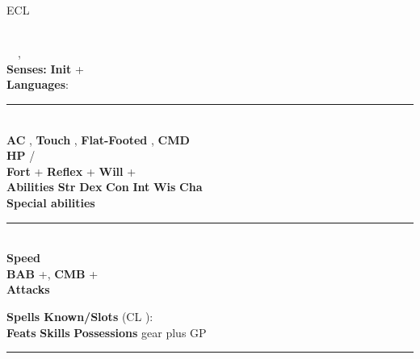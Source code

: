 \documentclass[article,10pt]{memoir}
\newcommand{\hr}{\vspace{-1.5ex}\rule{\linewidth}{0.4pt}}
\newcommand{\afterenum}{\everypar{\parindent=0pt\hangindent=1em}}
\newcounter{skillmod}
\newcounter{abilitymod}
\newcounter{classmod}
\newcommand{\skill}[6]{
 \ifthenelse{\equal{#2}{Str}}{
 \setcounter{abilitymod}{\value{strmod}}
}{\ifthenelse{\equal{#2}{Dex}}{
 \setcounter{abilitymod}{\value{dexmod}}
}{\ifthenelse{\equal{#2}{Con}}{
 \setcounter{abilitymod}{\value{conmod}}
}{\ifthenelse{\equal{#2}{Int}}{
 \setcounter{abilitymod}{\value{intmod}}
}{\ifthenelse{\equal{#2}{Wis}}{
 \setcounter{abilitymod}{\value{wismod}}
}{\ifthenelse{\equal{#2}{Cha}}{
 \setcounter{abilitymod}{\value{chamod}}
}{
}}}}}}
\ifthenelse{\equal{#1}{Perception}}{
\setcounter{classmod}{\minof{#3}{#5}*3}
\setcounter{skillmod}{#3+\value{abilitymod}+#4+\value{classmod}}
#1 +\arabic{skillmod}
}{}}
\begin{document}




{\LARGE \charname \large\hfill ECL  }

\begin{multicols}{2}
\begingroup
{}\selectfont
\raggedright
\afterenum
\charrace \ \charclass \\
\charalignment \ \charsize \ \chartype, \\
\textbf{Senses:}  \textbf{Init} +\\
\renewcommand{\skill}[6]{
 \ifthenelse{\equal{#2}{Str}}{
 \setcounter{abilitymod}{\value{strmod}}
}{\ifthenelse{\equal{#2}{Dex}}{
 \setcounter{abilitymod}{\value{dexmod}}
}{\ifthenelse{\equal{#2}{Con}}{
 \setcounter{abilitymod}{\value{conmod}}
}{\ifthenelse{\equal{#2}{Int}}{
 \setcounter{abilitymod}{\value{intmod}}
}{\ifthenelse{\equal{#2}{Wis}}{
 \setcounter{abilitymod}{\value{wismod}}
}{\ifthenelse{\equal{#2}{Cha}}{
 \setcounter{abilitymod}{\value{chamod}}
}{
}}}}}}
\ifthenelse{#3 = 0}{}{
\setcounter{classmod}{\minof{#3}{#5}*3}
\setcounter{skillmod}{#3+\value{abilitymod}+#4+\value{classmod}}
#1 +\arabic{skillmod}
}}
\textbf{Languages}: \languages 
\\
\hr \\
\textbf{AC} , \textbf{Touch} , \textbf{Flat-Footed} , \textbf{CMD} \\
\textbf{HP} / \\
\textbf{Fort} + \textbf{Reflex} + \textbf{Will} +\\
\textbf{Abilities} \textbf{Str}  \textbf{Dex}  \textbf{Con}  \textbf{Int}  \textbf{Wis}  \textbf{Cha} \\
\textbf{Special abilities} \specialabilities 
\\
\hr \\
\textbf{Speed} \speed \\
\textbf{BAB} +, \textbf{CMB} +\\
\textbf{Attacks}

\textbf{Spells Known/Slots} (CL ):\\
\spellsknown
\textbf{Feats}
\feats
\textbf{Skills} 
\textbf{Possessions} gear plus GP\\

\hr \\
\afterenum
\end{multicols}

\endgroup
\end{document}
